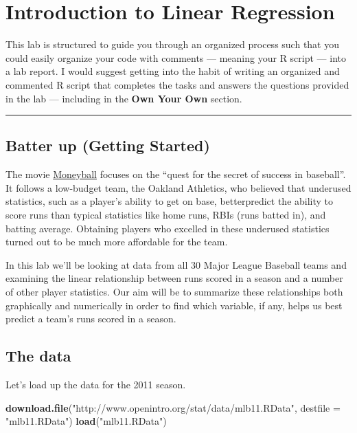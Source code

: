 \documentclass[]{book}
\newenvironment{Shaded}{\begin{snugshade}}{\end{snugshade}}
\newcommand{\KeywordTok}[1]{\textcolor[rgb]{0.13,0.29,0.53}{\textbf{{#1}}}}
\newcommand{\DataTypeTok}[1]{\textcolor[rgb]{0.13,0.29,0.53}{{#1}}}
\newcommand{\StringTok}[1]{\textcolor[rgb]{0.31,0.60,0.02}{{#1}}}
\newcommand{\NormalTok}[1]{{#1}}
\theoremstyle{definition}
\theoremstyle{definition}
\theoremstyle{definition}
\theoremstyle{remark}
\begin{document}
\chapter{Introduction to Linear
Regression}\label{introduction-to-linear-regression}

This lab is structured to guide you through an organized process such
that you could easily organize your code with comments --- meaning your
R script --- into a lab report. I would suggest getting into the habit
of writing an organized and commented R script that completes the tasks
and answers the questions provided in the lab --- including in the
\textbf{Own Your Own} section.

\begin{center}\rule{0.5\linewidth}{\linethickness}\end{center}

\section{Batter up (Getting Started)}\label{batter-up-getting-started}

The movie
\href{http://en.wikipedia.org/wiki/Moneyball_(film)}{Moneyball} focuses
on the ``quest for the secret of success in baseball''. It follows a
low-budget team, the Oakland Athletics, who believed that underused
statistics, such as a player's ability to get on base, betterpredict the
ability to score runs than typical statistics like home runs, RBIs (runs
batted in), and batting average. Obtaining players who excelled in these
underused statistics turned out to be much more affordable for the team.

In this lab we'll be looking at data from all 30 Major League Baseball
teams and examining the linear relationship between runs scored in a
season and a number of other player statistics. Our aim will be to
summarize these relationships both graphically and numerically in order
to find which variable, if any, helps us best predict a team's runs
scored in a season.

\section{The data}\label{the-data-4}

Let's load up the data for the 2011 season.

\begin{Shaded}
\begin{Highlighting}[]
\KeywordTok{download.file}\NormalTok{(}\StringTok{"http://www.openintro.org/stat/data/mlb11.RData"}\NormalTok{, }\DataTypeTok{destfile =} \StringTok{"mlb11.RData"}\NormalTok{)}
\KeywordTok{load}\NormalTok{(}\StringTok{"mlb11.RData"}\NormalTok{)}
\end{Highlighting}
\end{Shaded}
\end{document}

